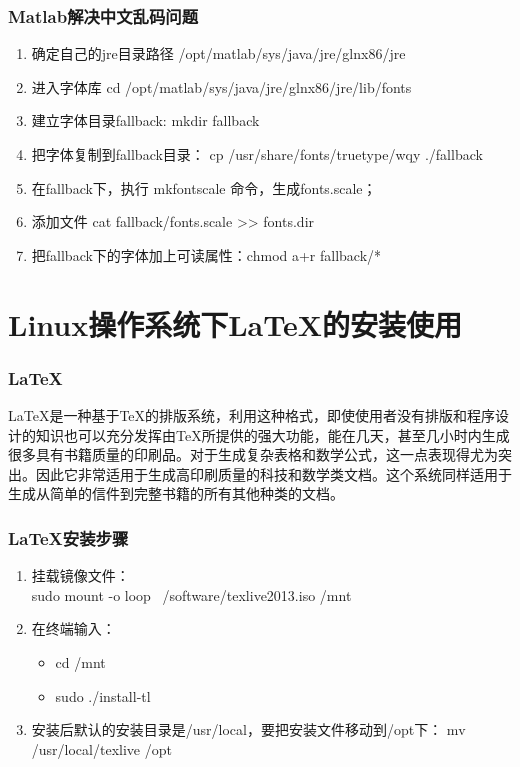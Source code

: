 \documentclass[notheorems,mathserif,table,compress]{beamer}  %
\begin{document}
\begin{frame}
 \frametitle{Matlab解决中文乱码问题}
  \begin{enumerate}
  \item 确定自己的jre目录路径 /opt/matlab/sys/java/jre/glnx86/jre 
  \item 进入字体库 cd /opt/matlab/sys/java/jre/glnx86/jre/lib/fonts
  \item 建立字体目录fallback: mkdir fallback
  \item 把字体复制到fallback目录： cp /usr/share/fonts/truetype/wqy ./fallback
  \item 在fallback下，执行 mkfontscale 命令，生成fonts.scale；
  \item 添加文件  cat fallback/fonts.scale >> fonts.dir 
  \item 把fallback下的字体加上可读属性：chmod a+r fallback/*
  \end{enumerate}
\end{frame}

\section{Linux操作系统下\LaTeX{}的安装使用}
\begin{frame}
  \frametitle{\LaTeX{}}
 \hspace{2em}  \LaTeX{}是一种基于TeX的排版系统，利用这种格式，即使使用者没有排版和程序设计的知识也可以充分发挥由TeX所提供的强大功能，能在几天，甚至几小时内生成很多具有书籍质量的印刷品。对于生成复杂表格和数学公式，这一点表现得尤为突出。因此它非常适用于生成高印刷质量的科技和数学类文档。这个系统同样适用于生成从简单的信件到完整书籍的所有其他种类的文档。
\end{frame}


\begin{frame}
  \frametitle{\LaTeX{}安装步骤}
  \begin{enumerate}
  \item 挂载镜像文件：\\
  sudo mount -o loop ~/software/texlive2013.iso /mnt
  \item 在终端输入：
      \begin{itemize}
      \item   cd /mnt
      \item   sudo ./install-tl
      \end{itemize}
  \item 安装后默认的安装目录是/usr/local，要把安装文件移动到/opt下：
  mv /usr/local/texlive /opt
  \end{enumerate}
\end{frame}
\end{document}
